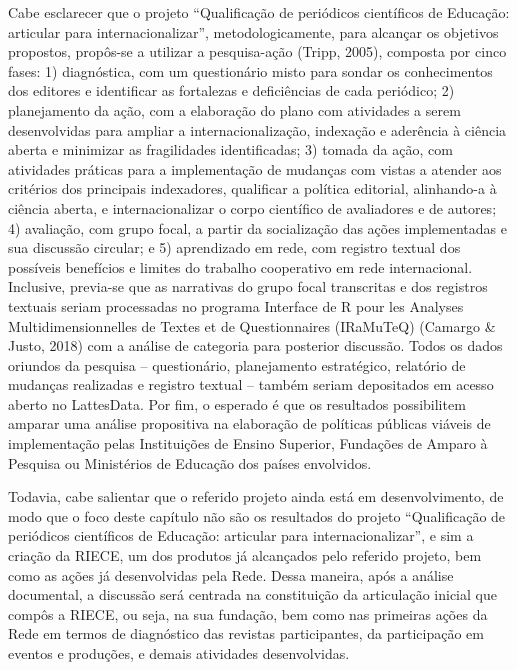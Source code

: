 \documentclass[
  a4paper,
]{book}
\begin{document}
Cabe esclarecer que o projeto ``Qualificação de periódicos científicos
de Educação: articular para internacionalizar'', metodologicamente, para
alcançar os objetivos propostos, propôs-se a utilizar a pesquisa-ação
(Tripp, 2005), composta por cinco fases: 1) diagnóstica, com um
questionário misto para sondar os conhecimentos dos editores e
identificar as fortalezas e deficiências de cada periódico; 2)
planejamento da ação, com a elaboração do plano com atividades a serem
desenvolvidas para ampliar a internacionalização, indexação e aderência
à ciência aberta e minimizar as fragilidades identificadas; 3) tomada da
ação, com atividades práticas para a implementação de mudanças com
vistas a atender aos critérios dos principais indexadores, qualificar a
política editorial, alinhando-a à ciência aberta, e internacionalizar o
corpo científico de avaliadores e de autores; 4) avaliação, com grupo
focal, a partir da socialização das ações implementadas e sua discussão
circular; e 5) aprendizado em rede, com registro textual dos possíveis
benefícios e limites do trabalho cooperativo em rede internacional.
Inclusive, previa-se que as narrativas do grupo focal transcritas e dos
registros textuais seriam processadas no programa Interface de R pour
les Analyses Multidimensionnelles de Textes et de Questionnaires
(IRaMuTeQ) (Camargo \& Justo, 2018) com a análise de categoria para
posterior discussão. Todos os dados oriundos da pesquisa --
questionário, planejamento estratégico, relatório de mudanças realizadas
e registro textual -- também seriam depositados em acesso aberto no
LattesData. Por fim, o esperado é que os resultados possibilitem amparar
uma análise propositiva na elaboração de políticas públicas viáveis de
implementação pelas Instituições de Ensino Superior, Fundações de Amparo
à Pesquisa ou Ministérios de Educação dos países envolvidos.

Todavia, cabe salientar que o referido projeto ainda está em
desenvolvimento, de modo que o foco deste capítulo não são os resultados
do projeto ``Qualificação de periódicos científicos de Educação:
articular para internacionalizar'', e sim a criação da RIECE, um dos
produtos já alcançados pelo referido projeto, bem como as ações já
desenvolvidas pela Rede. Dessa maneira, após a análise documental, a
discussão será centrada na constituição da articulação inicial que
compôs a RIECE, ou seja, na sua fundação, bem como nas primeiras ações
da Rede em termos de diagnóstico das revistas participantes, da
participação em eventos e produções, e demais atividades desenvolvidas.
\end{document}
